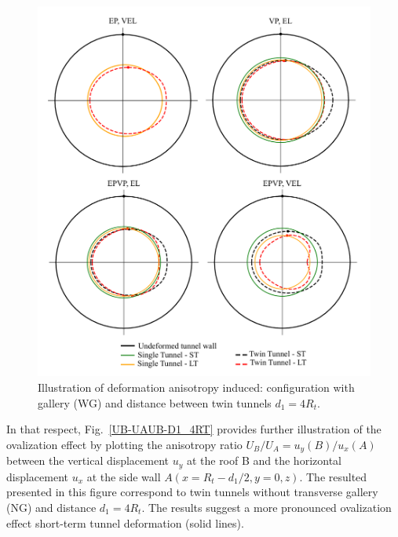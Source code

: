 \documentclass[a4paper,fleqn]{cas-sc}
\begin{document}
\begin{figure}[h!]
	\centering
	\includegraphics[scale=0.4]{ovalization.pdf}
	\caption{Illustration of deformation anisotropy induced: configuration with gallery (WG) and distance between twin tunnels $d_1 = 4R_t$.}
	\label{ovalization}
\end{figure}
\FloatBarrier

In that respect, Fig.~\ref{UB-UAUB-D1_4RT} provides further illustration of the ovalization effect by plotting the anisotropy ratio $U_B/U_A = u_y(B)/u_x(A)$ between the vertical displacement $u_y$ at the roof B and the horizontal displacement $u_x$ at the side wall $A(x=R_t - d_1/2,y=0,z)$. The resulted presented in this figure correspond to twin tunnels without transverse gallery (NG) and distance $d_1=4R_t$. The results suggest a more pronounced ovalization effect short-term tunnel deformation (solid lines).
\end{document}
